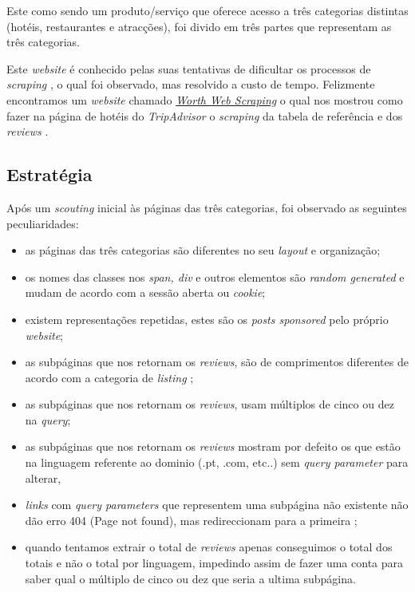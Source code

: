Este como sendo um produto/serviço que oferece acesso a três categorias distintas (hotéis, restaurantes e atracções), foi divido em três partes que representam as três categorias.

Este \textit{website} é conhecido pelas suas tentativas de dificultar os processos de \textit{scraping} \cite{wws1}, o qual foi observado, mas resolvido a custo de tempo. Felizmente encontramos um \textit{website} chamado \href{https://www.worthwebscraping.com/}{\textit{Worth Web Scraping}} o qual nos mostrou como fazer na página de hotéis do \textit{TripAdvisor} o \textit{scraping} da tabela de referência e dos \textit{reviews} \cite{wws2}.

\subsection{Estratégia}

Após um \textit{scouting} inicial às páginas das três categorias, foi observado as seguintes peculiaridades:
\begin{itemize}
  \setlength\itemsep{0.05em}
  \item as páginas das três categorias são diferentes no seu \textit{layout} e organização;
  \item os nomes das classes nos \textit{span, div} e outros elementos são \textit{random generated} e mudam de acordo com a sessão aberta ou \textit{cookie};
  \item existem representações repetidas, estes são os \textit{posts sponsored} \cite{wws1} pelo próprio \textit{website};
  \item as subpáginas que nos retornam os \textit{reviews}, são de comprimentos diferentes de acordo com a categoria de \textit{listing} \cite{wws2};
  \item as subpáginas que nos retornam os \textit{reviews}, usam múltiplos de cinco ou dez na \textit{query};
  \item as subpáginas que nos retornam os \textit{reviews} mostram por defeito os que estão na linguagem referente ao dominio (.pt, .com, etc..) sem \textit{query parameter} para alterar,
  \item \textit{links} com \textit{query parameters} que representem uma subpágina não existente não dão erro 404 (Page not found), mas redireccionam para a primeira \cite{wws2};
  \item quando tentamos extrair o total de \textit{reviews} apenas conseguimos o total dos totais e não o total por linguagem, impedindo assim de fazer uma conta para saber qual o múltiplo de cinco ou dez que seria a ultima subpágina.
\end{itemize}

